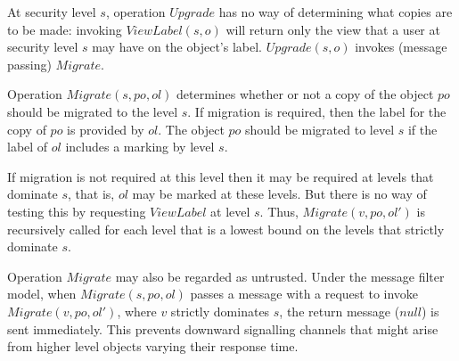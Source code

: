 At security level $s$, operation $Upgrade$ has no way of determining 
what copies are to be made: invoking $ViewLabel(s,o)$ will 
return only the view that a user at security level $s$ 
may have on the  object's label. 
$Upgrade(s,o)$ invokes (message passing) $Migrate$. 
\begin{center}
\end{center}
Operation $Migrate(s,po,ol)$ determines whether or not a copy of the
object $po$ should be migrated to the level $s$. If  migration is
required, then the label for the copy of $po$ is provided by $ol$. The
object $po$ should be migrated to level $s$ if the label of $ol$ 
includes a marking by level $s$.

If migration is not required at this level then it may be required at
levels that dominate $s$, that is, $ol$ may be marked at these levels. 
But there is no way of testing this by requesting $ViewLabel$ at 
level $s$. Thus, $Migrate(v,po, ol')$ is recursively called 
for each level that is a lowest bound on the levels that strictly dominate 
$s$. 

Operation $Migrate$ may also be regarded as untrusted.  Under the
message filter model, when $Migrate(s,po,ol)$ passes a message 
with a request to invoke $Migrate(v,po,ol')$, where $v$ strictly
dominates $s$, the return message ($null$) is sent immediately. This
prevents downward signalling channels that might arise from higher
level objects varying their response time.

